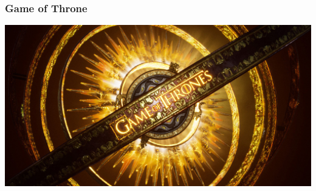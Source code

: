 \documentclass[aspectratio=1611, 9pt]{beamer}
\begin{document}
\begin{frame}
  \frametitle{Game of Throne}

  \includegraphics[width=\textwidth]{pictures/gameOfThrone.jpg}

\end{frame}
\end{document}
